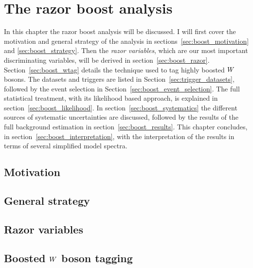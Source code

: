 \chapter{The razor boost analysis \label{chap:razorboost}}

In this chapter the razor boost analysis will be discussed. 
I will first cover the motivation and general strategy of the analysis in 
sections~\ref{sec:boost_motivation} and \ref{sec:boost_strategy}. Then the \textit{razor variables},
which are our most important discriminating variables, will be derived in 
section~\ref{sec:boost_razor}. Section~\ref{sec:boost_wtag} details the technique used to tag highly
boosted $W$ bosons. 
The datasets and triggers are listed in Section~\ref{sec:trigger_datasets}, followed by the event
selection in Section~\ref{sec:boost_event_selection}. 
The full statistical treatment, with its likelihood based approach, is explained in 
section~\ref{sec:boost_likelihood}. In section~\ref{sec:boost_systematics} the different sources of
systematic uncertainties are discussed, followed by the results of the full background estimation in
section~\ref{sec:boost_results}. This chapter concludes, in section~\ref{sec:boost_interpretation},
with the interpretation of the results in terms of several simplified model spectra. 

\section{Motivation \label{sec:boost_motivation}}




\section{General strategy \label{sec:boost_strategy}}




\section{Razor variables \label{sec:boost_razor}}




\section[Boosted W boson tagging]{Boosted $W$ boson tagging \label{sec:boost_wtag}}

